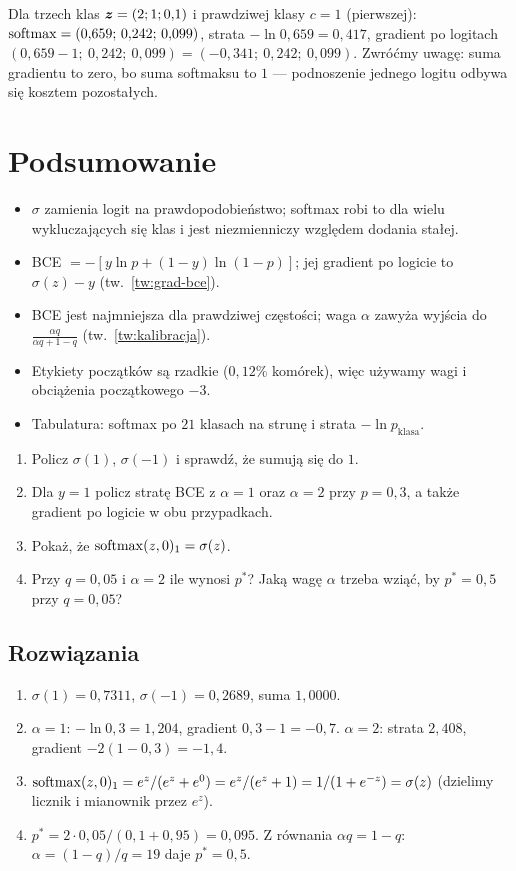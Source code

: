 \begin{naliczbach}
Dla trzech klas $\bm{z}=(2;1;0{,}1)$ i prawdziwej klasy $c=1$ (pierwszej): $\operatorname{softmax}=(0{,}659;\,0{,}242;\,0{,}099)$, strata $-\ln0{,}659=0{,}417$, gradient po logitach $(0{,}659-1;\ 0{,}242;\ 0{,}099)=(-0{,}341;\ 0{,}242;\ 0{,}099)$.
Zwróćmy uwagę: suma gradientu to zero, bo suma softmaksu to $1$ --- podnoszenie jednego logitu odbywa się kosztem pozostałych.
\end{naliczbach}

\section*{Podsumowanie}
\begin{itemize}
\item $\sigma$ zamienia logit na prawdopodobieństwo; softmax robi to dla wielu wykluczających się klas i jest niezmienniczy względem dodania stałej.
\item BCE $=-[y\ln p+(1-y)\ln(1-p)]$; jej gradient po logicie to $\sigma(z)-y$ (tw.~\ref{tw:grad-bce}).
\item BCE jest najmniejsza dla prawdziwej częstości; waga $\alpha$ zawyża wyjścia do $\frac{\alpha q}{\alpha q+1-q}$ (tw.~\ref{tw:kalibracja}).
\item Etykiety początków są rzadkie ($0{,}12\%$ komórek), więc używamy wagi i obciążenia początkowego $-3$.
\item Tabulatura: softmax po $21$ klasach na strunę i strata $-\ln p_{\mathrm{klasa}}$.
\end{itemize}

\begin{sprawdz}
\begin{enumerate}
\item Policz $\sigma(1)$, $\sigma(-1)$ i sprawdź, że sumują się do $1$.
\item Dla $y=1$ policz stratę BCE z $\alpha=1$ oraz $\alpha=2$ przy $p=0{,}3$, a także gradient po logicie w obu przypadkach.
\item Pokaż, że $\operatorname{softmax}(z,0)_1=\sigma(z)$.
\item Przy $q=0{,}05$ i $\alpha=2$ ile wynosi $p^\ast$? Jaką wagę $\alpha$ trzeba wziąć, by $p^\ast=0{,}5$ przy $q=0{,}05$?
\end{enumerate}
\end{sprawdz}

\subsection*{Rozwiązania}
\begin{enumerate}
\item $\sigma(1)=0{,}7311$, $\sigma(-1)=0{,}2689$, suma $1{,}0000$.
\item $\alpha=1$: $-\ln0{,}3=1{,}204$, gradient $0{,}3-1=-0{,}7$. $\alpha=2$: strata $2{,}408$, gradient $-2(1-0{,}3)=-1{,}4$.
\item $\operatorname{softmax}(z,0)_1=e^{z}/(e^{z}+e^{0})=e^{z}/(e^{z}+1)=1/(1+e^{-z})=\sigma(z)$ (dzielimy licznik i mianownik przez $e^{z}$).
\item $p^\ast=2\cdot0{,}05/(0{,}1+0{,}95)=0{,}095$. Z równania $\alpha q=1-q$: $\alpha=(1-q)/q=19$ daje $p^\ast=0{,}5$.
\end{enumerate}
